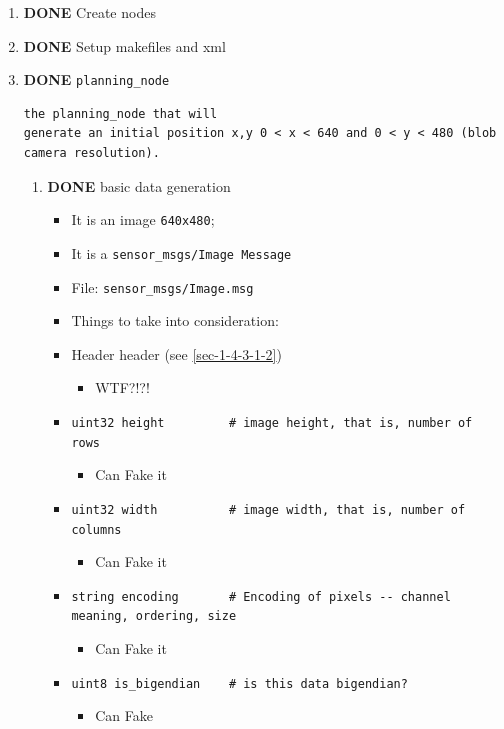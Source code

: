 \documentclass{article}
\begin{document}
\begin{enumerate}
\item {\bfseries\sffamily DONE} Create nodes
\label{sec-1-4-1}

\item {\bfseries\sffamily DONE} Setup makefiles and xml
\label{sec-1-4-2}

\item {\bfseries\sffamily DONE} \texttt{planning\_node}
\label{sec-1-4-3}
\begin{verbatim}
the planning_node that will
generate an initial position x,y 0 < x < 640 and 0 < y < 480 (blob
camera resolution).
\end{verbatim}
\begin{enumerate}
\item {\bfseries\sffamily DONE} basic data generation
\label{sec-1-4-3-1}
\begin{itemize}
\item It is an image \verb~640x480~;
\item It is a \texttt{sensor\_msgs/Image Message}
\item File: \texttt{sensor\_msgs/Image.msg}
\item Things to take into consideration:
\item Header header (see \ref{sec-1-4-3-1-2})
\begin{itemize}
\item WTF?!?!
\end{itemize}
\item \verb~uint32 height         # image height, that is, number of rows~
\begin{itemize}
\item Can Fake it
\end{itemize}
\item \verb~uint32 width          # image width, that is, number of columns~
\begin{itemize}
\item Can Fake it
\end{itemize}
\item \verb~string encoding       # Encoding of pixels -- channel meaning, ordering, size~
\begin{itemize}
\item Can Fake it
\end{itemize}
\item \verb~uint8 is_bigendian    # is this data bigendian?~
\begin{itemize}
\item Can Fake
\end{itemize}

\end{itemize}
\end{enumerate}
\end{enumerate}
\end{document}
